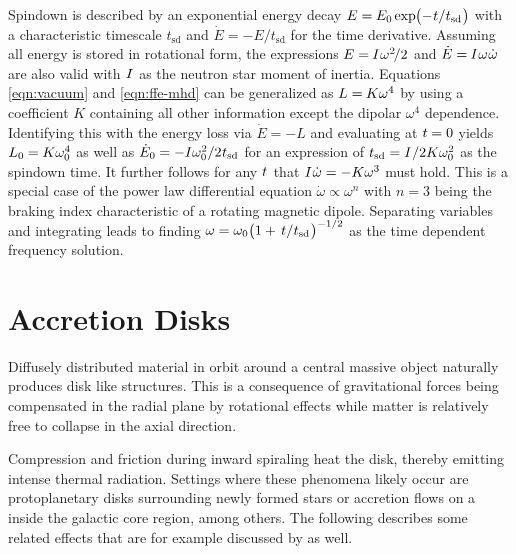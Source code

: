 Spindown is described by an exponential energy decay $E = \kern-0.3pt E_0 \kern-0.2pt \exp \kern-2.0pt
\smash{\bigl( - \kern+0.5pt t \kern+0.1pt / \kern+0.2pt t_\text{sd} \kern+0.5pt \bigr)}$ with a characteristic timescale
$t_\text{sd}$ and $\dot{E} = - E / t_\text{sd}$ for the time derivative. Assuming all energy is stored in
rotational form, the expressions $E = \kern-0.5pt I \kern+0.5pt \omega^2 \kern-1.5pt / 2$ and
$\dot{E} = \kern-0.5pt I \kern+0.5pt \omega \kern+0.5pt \dot{\omega}$ are also valid with $I \kern+0.5pt$ as the neutron star
moment of inertia. Equations \eqref{eqn:vacuum} and \eqref{eqn:ffe-mhd} can be generalized as $L = \kern-0.5pt K \omega^4$ by
using a coefficient $K$ containing all other information except the dipolar $\omega^4$ dependence. Identifying this with the energy
loss via $\dot{E} = -L$ and evaluating at $t \kern-0.3pt= 0$ yields $L_0 \kern-0.3pt = \kern-0.2pt K \omega_0^4$ as well as
$\dot{E}_0 \kern-0.3pt = -I \omega_0^2 / 2 \kern+0.4pt t_\text{sd}$ for an expression of
$t_\text{sd} = I \kern+0.5pt / 2K\omega_0^2$ as the spindown time. It further follows for any $t \kern+0.5pt$ that
$I \kern+0.5pt \dot{\omega} = -K \omega^3$ must hold. This is a special case of the power law differential equation
$\dot{\omega} \propto \omega^n$ with $n = 3$ being the braking index characteristic of a rotating magnetic dipole. Separating
variables and integrating leads to finding
$\omega = \omega_0 \smash{\bigl( 1 + \kern+1.5pt t \kern+0.1pt / \kern+0.2pt t_\text{sd} \kern+0.5pt \bigr)^{-1/2}}$
as the time dependent frequency solution.



\section{Accretion Disks}
\label{sec:luminosity}

Diffusely distributed material in orbit around a central massive object naturally produces disk like structures. This is a
consequence of gravitational forces being compensated in the radial plane by rotational effects while matter is relatively
free to collapse in the axial direction. 


\newpage


Compression and friction during inward spiraling heat the disk, thereby emitting intense thermal radiation. Settings where these
phenomena likely occur are protoplanetary disks surrounding newly formed stars or accretion flows on a  inside the galactic
core region, among others. The following describes some related effects that are for example discussed by \cite{Longair_2011} as well.



